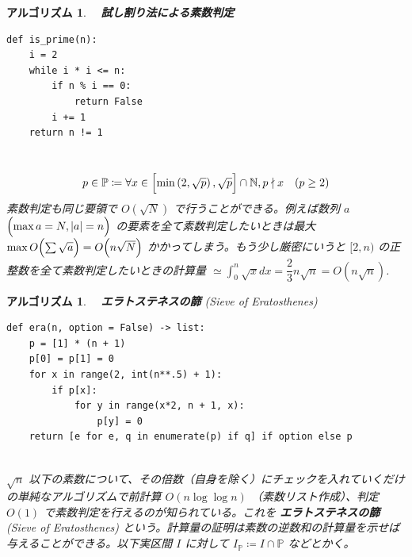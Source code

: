 \documentclass[12pt, a4j]{ltjsarticle}
\newtheorem{alg}[thm]{アルゴリズム}
\begin{document}
\vspace{1cm}

\begin{alg}\upshape　{\bf 試し割り法による素数判定} \\
\begin{lstlisting}
def is_prime(n):
    i = 2
    while i * i <= n:
        if n % i == 0:
            return False
        i += 1
    return n != 1
\end{lstlisting}
\quad\\
\begin{equation}
p \in \mathbb{P} \coloneqq \forall x \in \Bigl[\min \left(2,\sqrt{p} \right),\sqrt{p}\Bigr]\cap \mathbb{N}, p\nmid x \quad(p\ge2)
\end{equation}
素数判定も同じ要領で $O(\sqrt{N})$ で行うことができる。例えば数列 $a$ $\Bigl(
\max a=N, |a| = n\Bigr)$ の要素を全て素数判定したいときは最大 $\max O\Bigl(\sum \sqrt{a}\Bigr) = O\Bigl(n\sqrt{N}\Bigr)$ かかってしまう。もう少し厳密にいうと $[2, n)$ の正整数を全て素数判定したいときの計算量 $\simeq \displaystyle\int_0^n\sqrt{x}dx=\dfrac{2}{3}n\sqrt{n} = O\left(n\sqrt{n}\right)$.
\end{alg}

\vspace{1cm}

\begin{alg}\upshape　{\bf エラトステネスの篩} (Sieve of Eratosthenes)\\
\begin{lstlisting}
def era(n, option = False) -> list:
    p = [1] * (n + 1)
    p[0] = p[1] = 0
    for x in range(2, int(n**.5) + 1):
        if p[x]:
            for y in range(x*2, n + 1, x):
                p[y] = 0
    return [e for e, q in enumerate(p) if q] if option else p
\end{lstlisting}
\quad\\
$\sqrt{n}$ 以下の素数について、その倍数（自身を除く）にチェックを入れていくだけの単純なアルゴリズムで前計算 $O(n\log\log n)$ （素数リスト作成）、判定 $O(1)$ で素数判定を行えるのが知られている。これを {\bf エラトステネスの篩} (Sieve of Eratosthenes) という。計算量の証明は素数の逆数和の計算量を示せば与えることができる。以下実区間 $I$ に対して $I_\mathbb{P}\coloneqq I\cap\mathbb{P}$ などとかく。
\end{alg}
\end{document}

